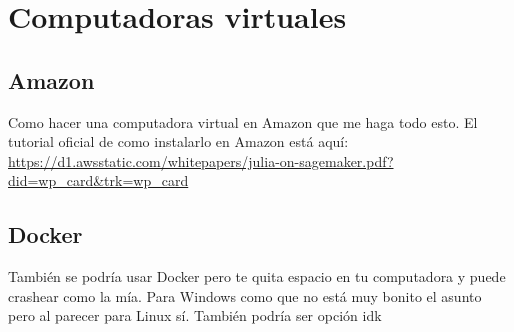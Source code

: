 \chapter{Computadoras virtuales}

\section{Amazon}
Como hacer una computadora virtual en Amazon que me haga todo esto. El tutorial oficial de como instalarlo en Amazon está aquí: \url{https://d1.awsstatic.com/whitepapers/julia-on-sagemaker.pdf?did=wp_card&trk=wp_card}

\section{Docker}
También se podría usar Docker pero te quita espacio en tu computadora y puede crashear como la mía. Para Windows como que no está muy bonito el asunto pero al parecer para Linux sí. También podría ser opción idk 